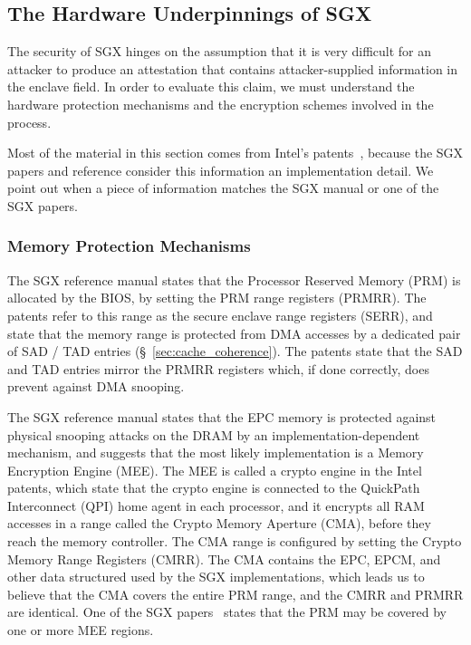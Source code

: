 \subsection{The Hardware Underpinnings of SGX}

The security of SGX hinges on the assumption that it is very difficult for an
attacker to produce an attestation that contains attacker-supplied information
in the enclave field. In order to evaluate this claim, we must understand the
hardware protection mechanisms and the encryption schemes involved in the
process.

Most of the material in this section comes from Intel's
patents~\cite{intel2013patent1, intel2013patent2}, because the SGX papers and
reference consider this information an implementation detail. We point out when
a piece of information matches the SGX manual or one of the SGX papers.



\subsubsection{Memory Protection Mechanisms}


The SGX reference manual states that the Processor Reserved Memory (PRM) is
allocated by the BIOS, by setting the PRM range registers (PRMRR). The patents
refer to this range as the secure enclave range registers (SERR), and state
that the memory range is protected from DMA accesses by a dedicated pair of
SAD / TAD entries (\S~\ref{sec:cache_coherence}).
The patents state that the SAD and TAD entries mirror the PRMRR registers
which, if done correctly, does prevent against DMA snooping.

The SGX reference manual states that the EPC memory is protected against
physical snooping attacks on the DRAM by an implementation-dependent mechanism,
and suggests that the most likely implementation is a Memory Encryption Engine
(MEE). The MEE is called a crypto engine in the Intel patents, which state that
the crypto engine is connected to the QuickPath Interconnect (QPI) home agent
in each processor, and it encrypts all RAM accesses in a range called the
Crypto Memory Aperture (CMA), before they reach the memory controller. The CMA
range is configured by setting the Crypto Memory Range Registers (CMRR). The
CMA contains the EPC, EPCM, and other data structured used by the SGX
implementations, which leads us to believe that the CMA covers the entire PRM
range, and the CMRR and PRMRR are identical. One of the SGX
papers~\cite{mckeen2013sgx} states that the PRM may be covered by one or more
MEE regions.


